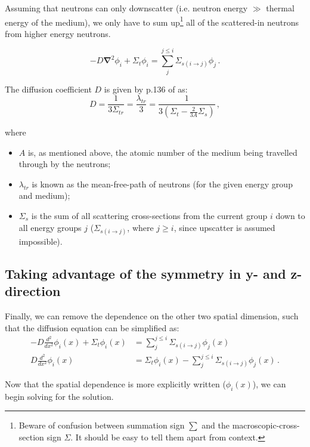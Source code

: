 \documentclass[a4paper, 12pt]{article}
\newcommand{\ve}[1]{\boldsymbol{#1}}
\begin{document}
Assuming that neutrons can only downscatter (i.e. neutron energy $\gg$ thermal energy of the medium), we only have to sum up\footnote{Beware of confusion between summation sign $\sum$ and the macroscopic-cross-section sign $\Sigma$. It should be easy to tell them apart from context.} all of the scattered-in neutrons from higher energy neutrons.

\begin{equation}\label{eq:TransportEqFicksLawGroupwise}
    -D\ve{\nabla}^2\phi_i + \Sigma_t \phi_i =\sum_j^{j\le i} \Sigma_{s(i\rightarrow j)} \phi_j\,.
\end{equation}

The diffusion coefficient $D$ is given by p.136 of \cite{Duderstadt} as:
\begin{equation}
    D = \frac{1}{3\Sigma_{tr}} = \frac{\lambda_{tr}}{3} = \frac{1}{3(\Sigma_t - \frac{2}{3A}{\Sigma_s})}\,,
\end{equation}

where
\begin{itemize}
    \item $A$ is, as mentioned above, the atomic number of the medium being travelled through by the neutrons;
    \item $\lambda_{tr}$ is known as the mean-free-path of neutrons (for the given energy group and medium);
    \item $\Sigma_s$ is the sum of all scattering cross-sections from the current group $i$ down to all energy groups $j$ ($\Sigma_{s(i\rightarrow j)}$, where $j\ge i$, since upscatter is assumed impossible).
\end{itemize}

\subsection{Taking advantage of the symmetry in y- and z-direction}
Finally, we can remove the dependence on the other two spatial dimension, such that the diffusion equation can be simplified as:
\begin{align}
    -D \frac{d^2}{dx^2}\phi_i(x) + \Sigma_t \phi_i(x) &= \sum_j^{j\le i} \Sigma_{s(i\rightarrow j)} \phi_j(x)\\
    D \frac{d^2}{dx^2}\phi_i(x) &= \Sigma_t \phi_i(x)  -\sum_j^{j\le i} \Sigma_{s(i\rightarrow j)} \phi_j(x)\,.\label{eq:TransportEqX}
\end{align}

Now that the spatial dependence is more explicitly written ($\phi_i(x)$), we can begin solving for the solution.
\end{document}
